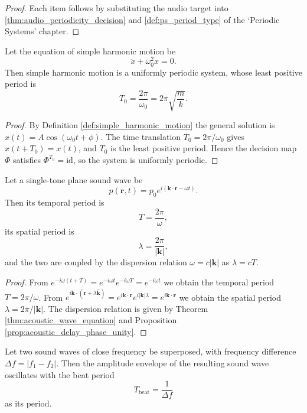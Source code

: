\begin{proof}
Each item follows by substituting the audio target into \cref{thm:audio_periodicity_decision} and \cref{def:ps_period_type} of the `Periodic Systems' chapter.
\end{proof}

\begin{lemma}\label{lem:shm_periodic}
Let the equation of simple harmonic motion be
\[
\ddot x+\omega_0^2x=0.
\]
Then simple harmonic motion is a uniformly periodic system, whose least positive period is
\[
T_0=\frac{2\pi}{\omega_0}=2\pi\sqrt{\frac{m}{k}}.
\]
\end{lemma}

\begin{proof}
By Definition \ref{def:simple_harmonic_motion} the general solution is $x(t)=A\cos(\omega_0t+\phi)$. The time translation $T_0=2\pi/\omega_0$ gives $x(t+T_0)=x(t)$, and $T_0$ is the least positive period. Hence the decision map $\Phi$ satisfies $\Phi^{T_0}=\mathrm{id}$, so the system is uniformly periodic.
\end{proof}

\begin{lemma}\label{lem:single_tone_periodic}
Let a single-tone plane sound wave be
\[
p(\mathbf r,t)=p_0e^{i(\mathbf k\cdot\mathbf r-\omega t)}.
\]
Then its temporal period is
\[
T=\frac{2\pi}{\omega},
\]
its spatial period is
\[
\lambda=\frac{2\pi}{|\mathbf k|},
\]
and the two are coupled by the dispersion relation $\omega=c|\mathbf k|$ as $\lambda=cT$.
\end{lemma}

\begin{proof}
From $e^{-i\omega(t+T)}=e^{-i\omega t}e^{-i\omega T}=e^{-i\omega t}$ we obtain the temporal period $T=2\pi/\omega$. From $e^{i\mathbf k\cdot(\mathbf r+\lambda\hat{\mathbf k})}=e^{i\mathbf k\cdot\mathbf r}e^{i|\mathbf k|\lambda}=e^{i\mathbf k\cdot\mathbf r}$ we obtain the spatial period $\lambda=2\pi/|\mathbf k|$. The dispersion relation is given by Theorem \ref{thm:acoustic_wave_equation} and Proposition \ref{prop:acoustic_delay_phase_unity}.
\end{proof}

\begin{lemma}\label{lem:beat_periodic}
Let two sound waves of close frequency be superposed, with frequency difference $\Delta f=|f_1-f_2|$. Then the amplitude envelope of the resulting sound wave oscillates with the beat period
\[
T_{\text{beat}}=\frac{1}{\Delta f}
\]
as its period.
\end{lemma}

